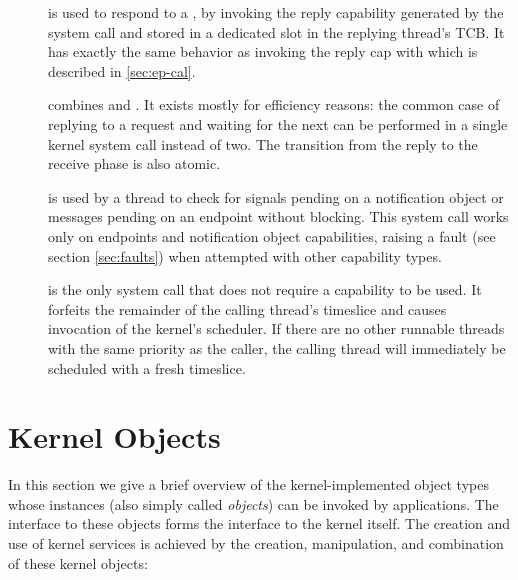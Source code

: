 \begin{description}
    \item[] is used to respond to a
      , by invoking the reply capability
      generated by the  system call and
      stored in a dedicated slot in the replying thread's TCB. It has exactly the
      same behavior as invoking the reply cap with
       which is described in
      \autoref{sec:ep-cal}.

    \item[] combines  and
    . It exists mostly for efficiency reasons: the common case of
    replying to a request and waiting for the next can be performed in
    a single kernel system call instead of two. The transition from
    the reply to the receive phase is also atomic.

    \item[] is used by a thread to check for
    signals pending on a notification object or messages pending on an endpoint without blocking.
    This system call works only on endpoints and notification object 
    capabilities, raising a fault (see section \ref{sec:faults}) when attempted
    with other capability types.

    \item[] is the only system call that does not require
    a capability to be used. It forfeits the remainder of the calling thread's
    timeslice and causes invocation of the kernel's scheduler.
    If there are no other runnable threads with the same
    priority as the caller, the calling thread will immediately be
    scheduled with a fresh timeslice.
\end{description}

\section{Kernel Objects}
\label{s:sel4_internals}

In this section we give a brief overview of the kernel-implemented
object types whose instances (also simply called \emph{objects}) can be invoked by applications. The interface to these
objects forms the interface to the kernel itself. The creation and use
of kernel services is achieved by the creation,
manipulation, and combination of these kernel objects:


